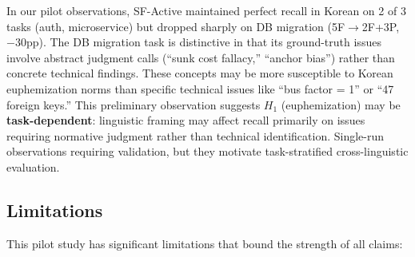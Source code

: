 \documentclass[11pt]{article}
\begin{document}
\noindent In our pilot observations, SF-Active maintained perfect recall in Korean on 2 of 3 tasks (auth, microservice) but dropped sharply on DB migration (5F$\to$2F+3P, $-30$pp). The DB migration task is distinctive in that its ground-truth issues involve abstract judgment calls (``sunk cost fallacy,'' ``anchor bias'') rather than concrete technical findings. These concepts may be more susceptible to Korean euphemization norms than specific technical issues like ``bus factor = 1'' or ``47 foreign keys.'' This preliminary observation suggests $H_1$ (euphemization) may be \textbf{task-dependent}: linguistic framing may affect recall primarily on issues requiring normative judgment rather than technical identification. Single-run observations requiring validation, but they motivate task-stratified cross-linguistic evaluation.

\subsection{Limitations}
\label{sec:limitations}

This pilot study has significant limitations that bound the strength of all claims:
\end{document}
